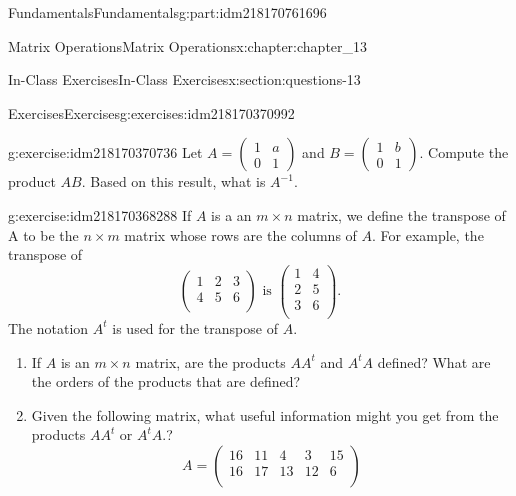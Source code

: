 \documentclass[oneside,10pt,]{book}
\numberwithin{equation}{section}
\begin{document}
\begin{partptx}{Fundamentals}{}{Fundamentals}{}{}{g:part:idm218170761696}
\begin{chapterptx}{Matrix Operations}{}{Matrix Operations}{}{}{x:chapter:chapter_13}
\begin{sectionptx}{In-Class Exercises}{}{In-Class Exercises}{}{}{x:section:questions-13}
\begin{exercises-subsection-numberless}{Exercises}{}{Exercises}{}{}{g:exercises:idm218170370992}
\begin{exercisegroup}
\begin{divisionexerciseeg}{1}{}{}{g:exercise:idm218170370736}
Let \(A=\left(\begin{array}{cc} 1 & a\\ 0 & 1 \end{array}\right)\) and \(B=\left(\begin{array}{cc} 1 & b\\ 0 & 1 \end{array}\right)\).  Compute the product \(A B\).  Based on this result, what is \(A^{-1}\).%
\end{divisionexerciseeg}%
\begin{divisionexerciseeg}{2}{}{}{g:exercise:idm218170368288}%
%
If \(A\) is a an \(m \times n\) matrix, we define the transpose of A to be the \(n \times m\) matrix whose rows are the columns of \(A\).  For example, the transpose of%
\begin{equation*}
\left(
\begin{array}{ccc}
1 &2 &3 \\
4 &5 &6 \\
\end{array}
\right) \textrm{  is  }
\left(
\begin{array}{cc}
1 &4 \\
2 &5 \\
3 &6 \\
\end{array}
\right).
\end{equation*}
The notation \(A^t\) is used for the transpose of \(A\).%
\begin{enumerate}[label=(\alph*)]
\item{}If \(A\) is an \(m \times n\) matrix, are the products \(A A^t\) and \(A^t A \) defined?  What are the orders of the products that are defined?%
\item{}Given the following matrix, what useful information might you get from the products \(A A^t\) or \(A^t A\).?%
\begin{equation*}
A=\left(
\begin{array}{ccccc}
16 &11 &4 &3 &15 \\
16 &17 &13 &12 &6 \\
\end{array}
\right) 
\end{equation*}
%
\end{enumerate}
%
\end{divisionexerciseeg}%
\end{exercisegroup}
\end{exercises-subsection-numberless}
\end{sectionptx}
\end{chapterptx}
\end{partptx}
\end{document}
